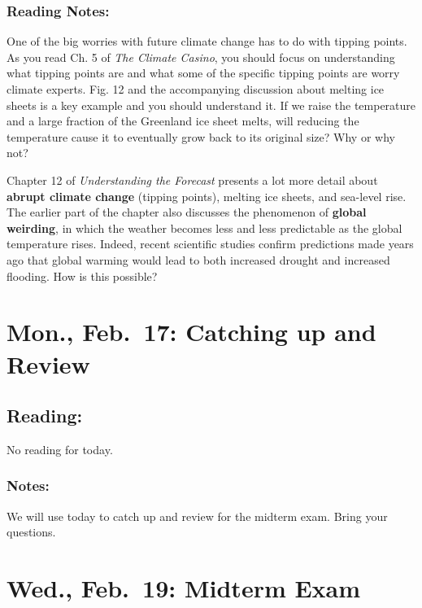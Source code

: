 \documentclass[
]{article}
\begin{document}
\hypertarget{reading-notes-13}{%
\subsubsection{Reading Notes:}\label{reading-notes-13}}

One of the big worries with future climate change has to do with tipping
points. As you read Ch. 5 of \emph{The Climate Casino}, you should focus
on understanding what tipping points are and what some of the specific
tipping points are worry climate experts. Fig. 12 and the accompanying
discussion about melting ice sheets is a key example and you should
understand it. If we raise the temperature and a large fraction of the
Greenland ice sheet melts, will reducing the temperature cause it to
eventually grow back to its original size? Why or why not?

Chapter 12 of \emph{Understanding the Forecast} presents a lot more
detail about \textbf{abrupt climate change} (tipping points), melting
ice sheets, and sea-level rise. The earlier part of the chapter also
discusses the phenomenon of \textbf{global weirding}, in which the
weather becomes less and less predictable as the global temperature
rises. Indeed, recent scientific studies confirm predictions made years
ago that global warming would lead to both increased drought and
increased flooding. How is this possible?

\hypertarget{mon.-feb.-17-catching-up-and-review}{%
\section{Mon., Feb.~17: Catching up and
Review}\label{mon.-feb.-17-catching-up-and-review}}

\hypertarget{reading-17}{%
\subsection{Reading:}\label{reading-17}}

No reading for today.

\hypertarget{notes-2}{%
\subsubsection{Notes:}\label{notes-2}}

We will use today to catch up and review for the midterm exam. Bring
your questions.

\hypertarget{wed.-feb.-19-midterm-exam}{%
\section{Wed., Feb.~19: Midterm Exam}\label{wed.-feb.-19-midterm-exam}}
\end{document}
